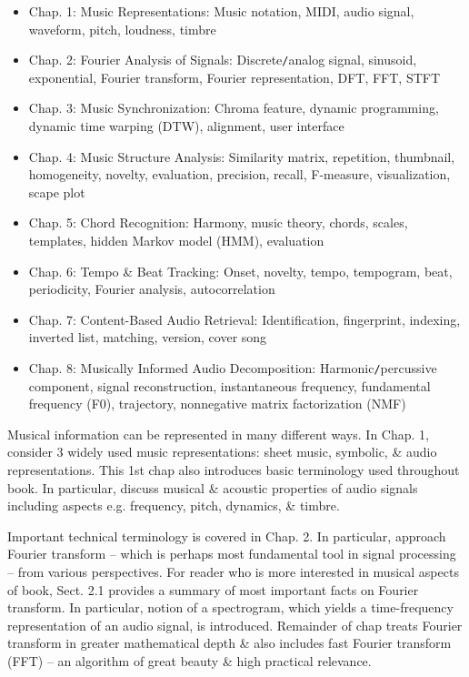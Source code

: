 \documentclass{article}
\begin{document}
\begin{itemize}
\begin{itemize}
		{}
		\begin{itemize}\sf
			\item Chap. 1: Music Representations: Music notation, MIDI, audio signal, waveform, pitch, loudness, timbre
			\item Chap. 2: Fourier Analysis of Signals: Discrete{\tt/}analog signal, sinusoid, exponential, Fourier transform, Fourier representation, DFT, FFT, STFT
			\item Chap. 3: Music Synchronization: Chroma feature, dynamic programming, dynamic time warping (DTW), alignment, user interface
			\item Chap. 4: Music Structure Analysis: Similarity matrix, repetition, thumbnail, homogeneity, novelty, evaluation, precision, recall, F-measure, visualization, scape plot
			\item Chap. 5: Chord Recognition: Harmony, music theory, chords, scales, templates, hidden Markov model (HMM), evaluation
			\item Chap. 6: Tempo \& Beat Tracking: Onset, novelty, tempo, tempogram, beat, periodicity, Fourier analysis, autocorrelation
			\item Chap. 7: Content-Based Audio Retrieval: Identification, fingerprint, indexing, inverted list, matching, version, cover song
			\item Chap. 8: Musically Informed Audio Decomposition: Harmonic{\tt/}percussive component, signal reconstruction, instantaneous frequency, fundamental frequency (F0), trajectory, nonnegative matrix factorization (NMF)
		\end{itemize}
		Musical information can be represented in many different ways. In Chap. 1, consider 3 widely used music representations: sheet music, symbolic, \& audio representations. This 1st chap also introduces basic terminology used throughout book. In particular, discuss musical \& acoustic properties of audio signals including aspects e.g. frequency, pitch, dynamics, \& timbre.
		
		Important technical terminology is covered in Chap. 2. In particular, approach Fourier transform -- which is perhaps most fundamental tool in signal processing -- from various perspectives. For reader who is more interested in musical aspects of book, Sect. 2.1 provides a summary of most important facts on Fourier transform. In particular, notion of a spectrogram, which yields a time-frequency representation of an audio signal, is introduced. Remainder of chap treats Fourier transform in greater mathematical depth \& also includes fast Fourier transform (FFT) -- an algorithm of great beauty \& high practical relevance.
		

\end{itemize}
\end{itemize}
\end{document}
